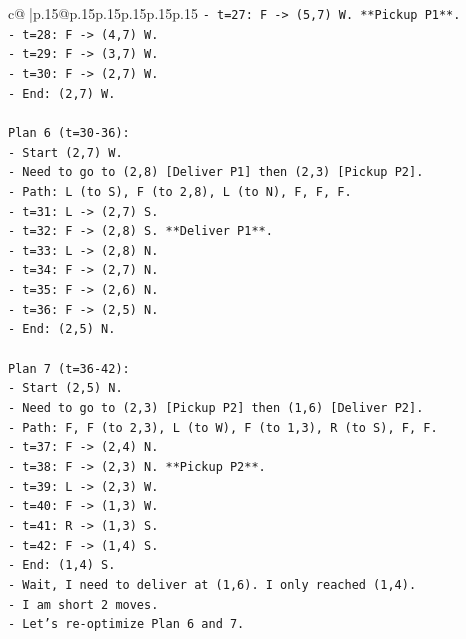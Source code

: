 \documentclass{article}
\begin{document}
{\begin{supertabular}{c@{$\;$}|p{.15\linewidth}@{}p{.15\linewidth}p{.15\linewidth}p{.15\linewidth}p{.15\linewidth}p{.15\linewidth}}
{{{\texttt{{-} t=27: F {-}> (5,7) W. **Pickup P1**.} \\
\texttt{{-} t=28: F {-}> (4,7) W.} \\
\texttt{{-} t=29: F {-}> (3,7) W.} \\
\texttt{{-} t=30: F {-}> (2,7) W.} \\
\texttt{{-} End: (2,7) W.} \\
\\ 
\texttt{Plan 6 (t=30{-}36):} \\
\texttt{{-} Start (2,7) W.} \\
\texttt{{-} Need to go to (2,8) {[}Deliver P1{]} then (2,3) {[}Pickup P2{]}.} \\
\texttt{{-} Path: L (to S), F (to 2,8), L (to N), F, F, F.} \\
\texttt{{-} t=31: L {-}> (2,7) S.} \\
\texttt{{-} t=32: F {-}> (2,8) S. **Deliver P1**.} \\
\texttt{{-} t=33: L {-}> (2,8) N.} \\
\texttt{{-} t=34: F {-}> (2,7) N.} \\
\texttt{{-} t=35: F {-}> (2,6) N.} \\
\texttt{{-} t=36: F {-}> (2,5) N.} \\
\texttt{{-} End: (2,5) N.} \\
\\ 
\texttt{Plan 7 (t=36{-}42):} \\
\texttt{{-} Start (2,5) N.} \\
\texttt{{-} Need to go to (2,3) {[}Pickup P2{]} then (1,6) {[}Deliver P2{]}.} \\
\texttt{{-} Path: F, F (to 2,3), L (to W), F (to 1,3), R (to S), F, F.} \\
\texttt{{-} t=37: F {-}> (2,4) N.} \\
\texttt{{-} t=38: F {-}> (2,3) N. **Pickup P2**.} \\
\texttt{{-} t=39: L {-}> (2,3) W.} \\
\texttt{{-} t=40: F {-}> (1,3) W.} \\
\texttt{{-} t=41: R {-}> (1,3) S.} \\
\texttt{{-} t=42: F {-}> (1,4) S.} \\
\texttt{{-} End: (1,4) S.} \\
\texttt{{-} Wait, I need to deliver at (1,6). I only reached (1,4).} \\
\texttt{{-} I am short 2 moves.} \\
\texttt{{-} Let's re{-}optimize Plan 6 and 7.} \\
}}}
\end{supertabular}}
\end{document}

